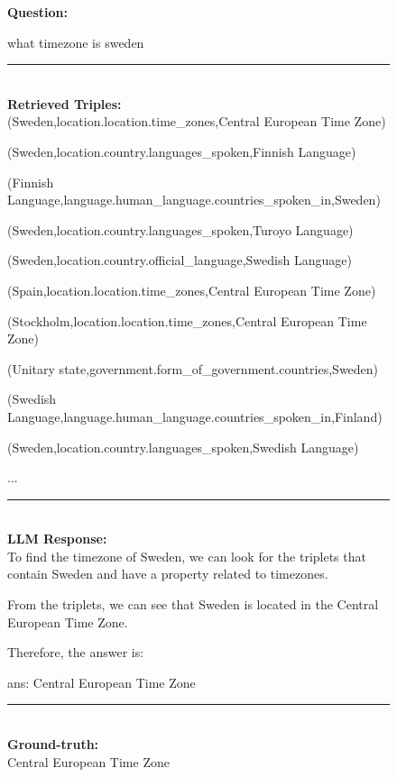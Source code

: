 \begin{figure}
\begin{tcolorbox}[colback=gray!5!white, colframe=gray!75!black, title=WebQSP-WebQTest-33]
\scriptsize

\textbf{Question:}\\
\raggedright what timezone is sweden

\rule{\linewidth}{0.4pt}
\\

\textbf{Retrieved Triples:}\\
(Sweden,location.location.time\_zones,Central European Time Zone)

(Sweden,location.country.languages\_spoken,Finnish Language)

(Finnish Language,language.human\_language.countries\_spoken\_in,Sweden)

(Sweden,location.country.languages\_spoken,Turoyo Language)

(Sweden,location.country.official\_language,Swedish Language)

(Spain,location.location.time\_zones,Central European Time Zone)

(Stockholm,location.location.time\_zones,Central European Time Zone)

(Unitary state,government.form\_of\_government.countries,Sweden)

(Swedish Language,language.human\_language.countries\_spoken\_in,Finland)

(Sweden,location.country.languages\_spoken,Swedish Language)

...

\rule{\linewidth}{0.4pt}
\\

\textbf{LLM Response:}\\
To find the timezone of Sweden, we can look for the triplets that contain Sweden and have a property related to timezones.



From the triplets, we can see that Sweden is located in the Central European Time Zone.



Therefore, the answer is:



ans: Central European Time Zone

\rule{\linewidth}{0.4pt}
\\
\textbf{Ground-truth:}\\
Central European Time Zone

\end{tcolorbox}
\end{figure}







